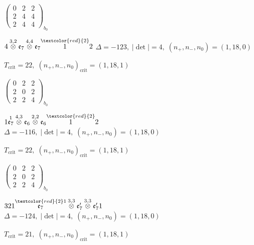 \documentclass[10pt]{article}
\begin{document}
\hspace{2em}$\left(\begin{smallmatrix}0 & 2 & 2 \\ 2 & 4 & 4 \\ 2 & 4 & 4\end{smallmatrix}\right)_{\!b_0}$

\smallskip

$4\overset{3,2}{\otimes}\mathfrak{e}_7\overset{4,4}{\otimes}\mathfrak{e}_7\overset{\textcolor{red}{2}}{1}2$ \quad $\Delta=-123,\; |\det|=4,\; (n_+,n_-,n_0)=(1,18,0)$

\hspace{1em}$T_{\text{crit}}=22,\; (n_+,n_-,n_0)_{\text{crit}}=(1,18,1)$

\hspace{2em}$\left(\begin{smallmatrix}0 & 2 & 2 \\ 2 & 0 & 2 \\ 2 & 2 & 4\end{smallmatrix}\right)_{\!b_0}$

\smallskip

$1\overset{1}{\mathfrak{e}_7}\overset{4,3}{\otimes}\mathfrak{e}_6\overset{2,2}{\otimes}\mathfrak{e}_6\overset{\textcolor{red}{2}}{1}2$ \quad $\Delta=-116,\; |\det|=4,\; (n_+,n_-,n_0)=(1,18,0)$

\hspace{1em}$T_{\text{crit}}=22,\; (n_+,n_-,n_0)_{\text{crit}}=(1,18,1)$

\hspace{2em}$\left(\begin{smallmatrix}0 & 2 & 2 \\ 2 & 0 & 2 \\ 2 & 2 & 4\end{smallmatrix}\right)_{\!b_0}$

\smallskip

$321\overset{\textcolor{red}{2}1}{\mathfrak{e}_7}\overset{3,3}{\otimes}\mathfrak{e}_7'\overset{3,3}{\otimes}\mathfrak{e}_7'1$ \quad $\Delta=-124,\; |\det|=4,\; (n_+,n_-,n_0)=(1,18,0)$

\hspace{1em}$T_{\text{crit}}=21,\; (n_+,n_-,n_0)_{\text{crit}}=(1,18,1)$
\end{document}

